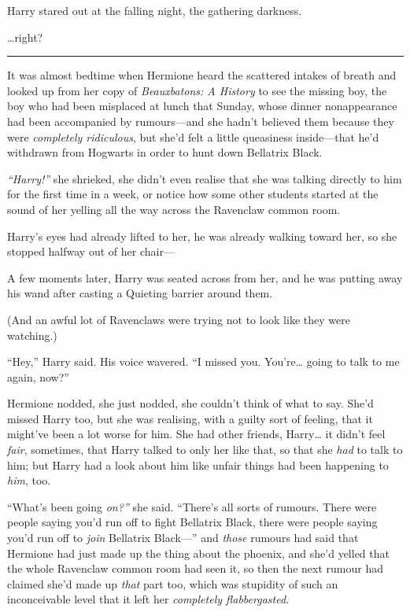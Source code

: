 Harry stared out at the falling night, the gathering darkness.

\ldots{}right?

\begin{center}\rule{3in}{0.4pt}\end{center}

It was almost bedtime when Hermione heard the scattered intakes of
breath and looked up from her copy of \emph{Beauxbatons: A History} to
see the missing boy, the boy who had been misplaced at lunch that
Sunday, whose dinner nonappearance had been accompanied by rumours---and
she hadn't believed them because they were \emph{completely ridiculous},
but she'd felt a little queasiness inside---that he'd withdrawn from
Hogwarts in order to hunt down Bellatrix Black.

\emph{``Harry!''} she shrieked, she didn't even realise that she was
talking directly to him for the first time in a week, or notice how some
other students started at the sound of her yelling all the way across
the Ravenclaw common room.

Harry's eyes had already lifted to her, he was already walking toward
her, so she stopped halfway out of her chair---

A few moments later, Harry was seated across from her, and he was
putting away his wand after casting a Quieting barrier around them.

(And an awful lot of Ravenclaws were trying not to look like they were
watching.)

``Hey,'' Harry said. His voice wavered. ``I missed you. You're\ldots{}
going to talk to me again, now?''

Hermione nodded, she just nodded, she couldn't think of what to say.
She'd missed Harry too, but she was realising, with a guilty sort of
feeling, that it might've been a lot worse for him. She had other
friends, Harry\ldots{} it didn't feel \emph{fair}, sometimes, that Harry
talked to only her like that, so that she \emph{had} to talk to him; but
Harry had a look about him like unfair things had been happening to
\emph{him}, too.

``What's been going \emph{on?''} she said. ``There's all sorts of
rumours. There were people saying you'd run off to fight Bellatrix
Black, there were people saying you'd run off to \emph{join} Bellatrix
Black---'' and \emph{those} rumours had said that Hermione had just made
up the thing about the phoenix, and she'd yelled that the whole
Ravenclaw common room had seen it, so then the next rumour had claimed
she'd made up \emph{that} part too, which was stupidity of such an
inconceivable level that it left her \emph{completely flabbergasted.}

